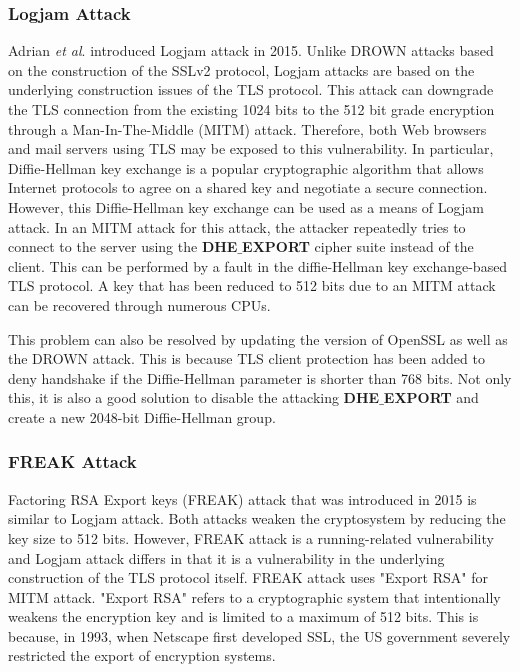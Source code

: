\documentclass[a4paper]{article}
\begin{document}
\subsubsection*{Logjam Attack}
Adrian \textit{et al}.\cite{logjam} introduced Logjam attack in 2015. Unlike DROWN attacks based on the construction of the SSLv2 protocol, Logjam attacks are based on the underlying construction issues of the TLS protocol. This attack can downgrade the TLS connection from the existing 1024 bits to the 512 bit grade encryption through a Man-In-The-Middle (MITM) attack. Therefore, both Web browsers and mail servers using TLS may be exposed to this vulnerability. In particular, Diffie-Hellman key exchange is a popular cryptographic algorithm that allows Internet protocols to agree on a shared key and negotiate a secure connection. However, this Diffie-Hellman key exchange can be used as a means of Logjam attack. In an MITM attack for this attack, the attacker repeatedly tries to connect to the server using the \textbf{DHE$\_$EXPORT} cipher suite instead of the client. This can be performed by a fault in the diffie-Hellman key exchange-based TLS protocol. A key that has been reduced to 512 bits due to an MITM attack can be recovered through numerous CPUs.

This problem can also be resolved by updating the version of OpenSSL as well as the DROWN attack. This is because TLS client protection has been added to deny handshake if the Diffie-Hellman parameter is shorter than 768 bits. Not only this, it is also a good solution to disable the attacking \textbf{DHE$\_$EXPORT} and create a new 2048-bit Diffie-Hellman group.

\subsubsection*{FREAK Attack}
Factoring RSA Export keys (FREAK) attack that was introduced in 2015 is similar to Logjam attack. Both attacks weaken the cryptosystem by reducing the key size to 512 bits. However, FREAK attack is a running-related vulnerability and Logjam attack differs in that it is a vulnerability in the underlying construction of the TLS protocol itself. FREAK attack uses "Export RSA" for MITM attack. "Export RSA" refers to a cryptographic system that intentionally weakens the encryption key and is limited to a maximum of 512 bits. This is because, in 1993, when Netscape first developed SSL, the US government severely restricted the export of encryption systems.
\end{document}
